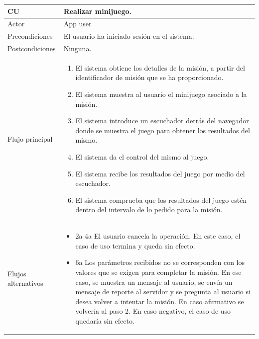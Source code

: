 \documentclass[twoside]{report}
\newcommand\addrow[2]{#1 &#2\\ }
\newcommand\addheading[2]{#1 &#2\\ \hline}
\newcommand\tabularhead{\begin{tabular}{lp{0.7\textwidth}}
\hline
}
\newenvironment{usecase}{\tabularhead}
{\hline\end{tabular}}
\begin{document}
\begin{usecase}
  \addheading{\textbf{CU\arabic{usecase}}}{Realizar minijuego.} 
  \addrow{Actor}{App user}
  \addrow{Precondiciones}{El usuario ha iniciado sesión en el sistema.}
  \addrow{Postcondiciones}{Ninguna.}
  \addrow{Flujo principal}{
  		\begin{enumerate}
  		\item El sistema obtiene los detalles de la misión, a partir del identificador de misión que se ha proporcionado. %
  		\item El sistema muestra al usuario el minijuego asociado a la misión. %
  		\item El sistema introduce un escuchador detrás del navegador donde se muestra el juego para obtener los resultados del mismo. %
  		\item El sistema da el control del mismo al juego. %
  		\item El sistema recibe los resultados del juego por medio del escuchador. %
  		\item El sistema comprueba que los resultados del juego estén dentro del intervalo de lo pedido para la misión. %
  		\end{enumerate}
  }
  \addrow{Flujos alternativos}{
  		\begin{itemize}
  		\item 2a 4a El usuario cancela la operación. En este caso, el caso de uso termina y queda sin efecto.
  		\item 6a Los parámetros recibidos no se corresponden con los valores que se exigen para completar la misión. En ese caso, se muestra un mensaje al usuario, se envía un mensaje de reporte al servidor y se pregunta al usuario si desea volver a intentar la misión. En caso afirmativo se volvería al paso 2. En caso negativo, el caso de uso quedaría sin efecto.
  		\end{itemize}
  }
\end{usecase}\\

\vspace{0.5cm}
\end{document}
